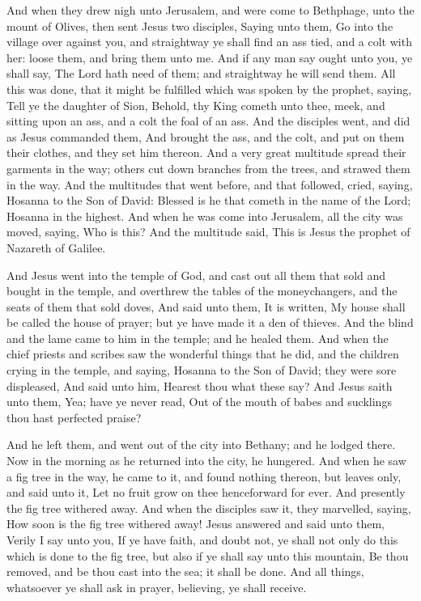  And when they drew nigh unto Jerusalem, and were come to
Bethphage, unto the mount of Olives, then sent Jesus two disciples,
 Saying unto them, Go into the village over against you,
and straightway ye shall find an ass tied, and a colt with her: loose
them, and bring them unto me.  And if any man say ought
unto you, ye shall say, The Lord hath need of them; and straightway he
will send them.  All this was done, that it might be
fulfilled which was spoken by the prophet, saying,  Tell
ye the daughter of Sion, Behold, thy King cometh unto thee, meek, and
sitting upon an ass, and a colt the foal of an ass.  And
the disciples went, and did as Jesus commanded them,  And
brought the ass, and the colt, and put on them their clothes, and they
set him thereon.  And a very great multitude spread their
garments in the way; others cut down branches from the trees, and
strawed them in the way.  And the multitudes that went
before, and that followed, cried, saying, Hosanna to the Son of David:
Blessed is he that cometh in the name of the Lord; Hosanna in the
highest.  And when he was come into Jerusalem, all the
city was moved, saying, Who is this?  And the multitude
said, This is Jesus the prophet of Nazareth of Galilee.

 And Jesus went into the temple of God, and cast out all
them that sold and bought in the temple, and overthrew the tables of the
moneychangers, and the seats of them that sold doves, 
And said unto them, It is written, My house shall be called the house of
prayer; but ye have made it a den of thieves.  And the
blind and the lame came to him in the temple; and he healed them.
 And when the chief priests and scribes saw the wonderful
things that he did, and the children crying in the temple, and saying,
Hosanna to the Son of David; they were sore displeased, 
And said unto him, Hearest thou what these say? And Jesus saith unto
them, Yea; have ye never read, Out of the mouth of babes and sucklings
thou hast perfected praise?

 And he left them, and went out of the city into Bethany;
and he lodged there.  Now in the morning as he returned
into the city, he hungered.  And when he saw a fig tree
in the way, he came to it, and found nothing thereon, but leaves only,
and said unto it, Let no fruit grow on thee henceforward for ever. And
presently the fig tree withered away.  And when the
disciples saw it, they marvelled, saying, How soon is the fig tree
withered away!  Jesus answered and said unto them, Verily
I say unto you, If ye have faith, and doubt not, ye shall not only do
this which is done to the fig tree, but also if ye shall say unto this
mountain, Be thou removed, and be thou cast into the sea; it shall be
done.  And all things, whatsoever ye shall ask in prayer,
believing, ye shall receive.

